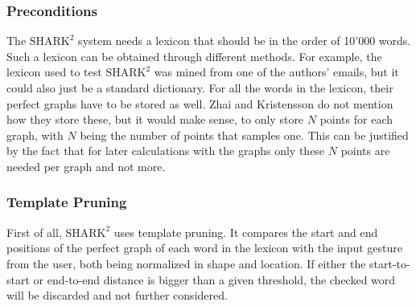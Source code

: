 \subsubsection{Preconditions}
The $\text{SHARK}^2$ system needs a lexicon that should be in the order of 10'000 words. Such a lexicon can be obtained through different methods. For example, the lexicon used to test $\text{SHARK}^2$ was mined from one of the authors' emails, but it could also just be a standard dictionary. For all the words in the lexicon, their perfect graphs have to be stored as well. Zhai and Kristensson \cite{Kristensson2004SHARK2AL} do not mention how they store these, but it would make sense, to only store $N$ points for each graph, with $N$ being the number of points that samples one. This can be justified by the fact that for later calculations with the graphs only these $N$ points are needed per graph and not more.

\subsubsection{Template Pruning}
First of all, $\text{SHARK}^2$ uses template pruning. It compares the start and end positions of the perfect graph of each word in the lexicon with the input gesture from the user, both being normalized in shape and location. If either the start-to-start or end-to-end distance is bigger than a given threshold, the checked word will be discarded and not further considered.

